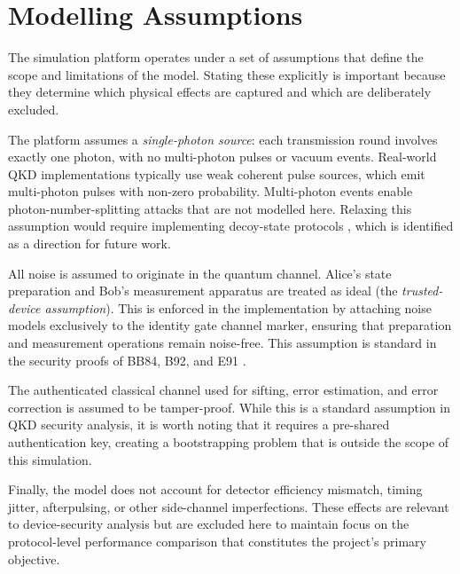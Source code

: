 % 



\section{Modelling Assumptions}

The simulation platform operates under a set of assumptions that define the scope and limitations of the model. Stating these explicitly is important because they determine which physical effects are captured and which are deliberately excluded.

The platform assumes a \textit{single-photon source}: each transmission round involves exactly one photon, with no multi-photon pulses or vacuum events. Real-world QKD implementations typically use weak coherent pulse sources, which emit multi-photon pulses with non-zero probability. Multi-photon events enable photon-number-splitting attacks that are not modelled here. Relaxing this assumption would require implementing decoy-state protocols \cite{Lo2005Decoy}, which is identified as a direction for future work.

All noise is assumed to originate in the quantum channel. Alice's state preparation and Bob's measurement apparatus are treated as ideal (the \textit{trusted-device assumption}). This is enforced in the implementation by attaching noise models exclusively to the identity gate channel marker, ensuring that preparation and measurement operations remain noise-free. This assumption is standard in the security proofs of BB84, B92, and E91 \cite{ShorPreskill2000, Scarani2009}.

The authenticated classical channel used for sifting, error estimation, and error correction is assumed to be tamper-proof. While this is a standard assumption in QKD security analysis, it is worth noting that it requires a pre-shared authentication key, creating a bootstrapping problem that is outside the scope of this simulation.

Finally, the model does not account for detector efficiency mismatch, timing jitter, afterpulsing, or other side-channel imperfections. These effects are relevant to device-security analysis but are excluded here to maintain focus on the protocol-level performance comparison that constitutes the project's primary objective.


